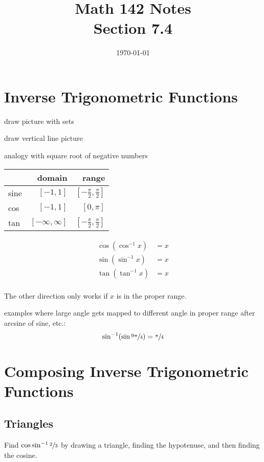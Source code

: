 \documentclass{exam}
\title{Math 142 Notes \\ Section 7.4}
\date{\today}
\begin{document}
  \maketitle
  \tableofcontents

  \section{Inverse Trigonometric Functions}

  \begin{itemize*}
    \item draw picture with sets
    \item draw vertical line picture
    \item analogy with square root of negative numbers
  \end{itemize*}

  \begin{tabular}[H]{lrr}
    \toprule
           & domain    & range \\
    \midrule
      sine & $[-1, 1]$ & $[- \frac{\pi}{2}, \frac{\pi}{2}]$ \\
    \midrule
      cos  & $[-1, 1]$ & $[0, \pi]$ \\
    \midrule
      tan  & $[-\infty, \infty]$ & $[- \frac{\pi}{2}, \frac{\pi}{2}]$ \\
    \bottomrule
  \end{tabular}

  \begin{align*}
    \cos(\cos^{-1} x) & = x \\
    \sin(\sin^{-1} x) & = x \\
    \tan(\tan^{-1} x) & = x \\
  \end{align*}

  \begin{itemize*}
    \item The other direction only works if $x$ is in the proper range.
    \item examples where large angle gets mapped to different angle in proper range after arcsine of sine, etc.:
      \[
        \sin^{-1}(\sin \sfrac{9 \pi}{4}) = \sfrac{\pi}{4}
      \]
  \end{itemize*}

  \section{Composing Inverse Trigonometric Functions}

  \subsection{Triangles}
  Find $\cos \sin^{-1}{\sfrac{2}{3}}$ by drawing a triangle, finding the hypotenuse, and then finding the cosine.
\end{document}
